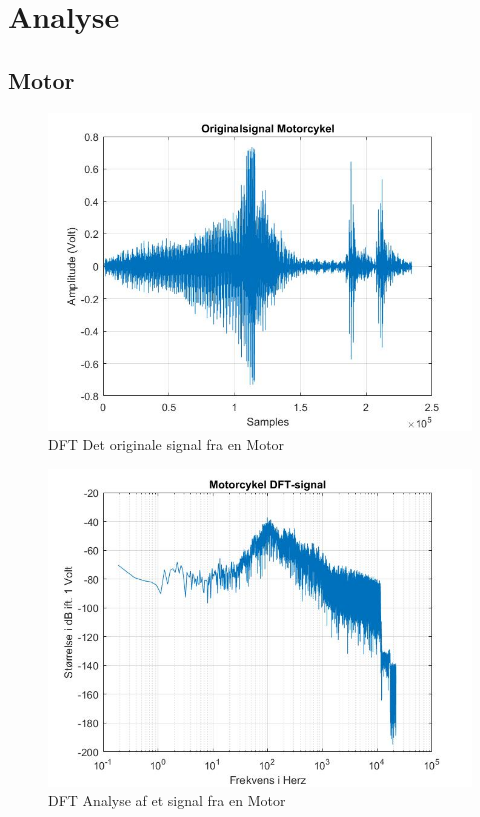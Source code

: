 \chapter{Analyse}\label{ch:analyse}



\section{Motor}

\begin{figure}[H]
	\centering
	\includegraphics[width=180mm]{figures/Motor/original.jpg}
	\caption{DFT Det originale signal fra en Motor}
	\label{fig:Motor original}
\end{figure}

\begin{figure}[H]
	\centering
	\includegraphics[width=180mm]{figures/Motor/DFT.jpg}
	\caption{DFT Analyse af et signal fra en Motor}
	\label{fig:Motor DFT}
\end{figure}


